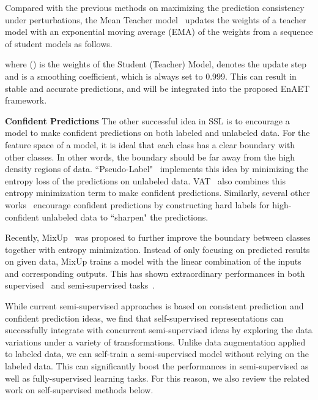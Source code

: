 \documentclass[journal]{IEEEtran}
\begin{document}
\par Compared with the previous methods on maximizing the prediction consistency under perturbations, the Mean Teacher model~\cite{tarvainen2017mean} updates the weights of a teacher model with an exponential moving average (EMA) of the weights from a sequence of student models as follows.

where  () is the weights of the Student (Teacher) Model,  denotes the update step and  is a smoothing coefficient, which is always set to 0.999. This can result in stable and accurate predictions, and will be integrated into the proposed EnAET framework.


{\noindent\bf Confident Predictions} The other successful idea in SSL is to encourage a model to make confident predictions on both labeled and unlabeled data. For the feature space of a model, it is ideal that each class has a clear boundary with other classes. In other words, the boundary  should be far away from the high density regions of data. ``Pseudo-Label"~\cite{grandvalet2005semi}  implements this idea by minimizing the entropy loss of the predictions on unlabeled data. VAT~\cite{miyato2018virtual} also combines this entropy minimization term to make confident predictions. Similarly, several other works~\cite{lee2013pseudo,berthelot2019mixmatch} encourage confident predictions by constructing hard labels for high-confident unlabeled data to ``sharpen" the predictions.

\par Recently, MixUp~\cite{zhang2017mixup} was proposed to further improve the boundary between classes together with entropy minimization. Instead of only focusing on predicted results on given data, MixUp trains a model with the linear combination of the inputs and corresponding outputs. This has shown extraordinary performances in both supervised~\cite{zhang2017mixup} and semi-supervised tasks~\cite{berthelot2019mixmatch,verma2019interpolation}.

While current semi-supervised approaches is based on consistent prediction and confident prediction ideas, we find that self-supervised representations can successfully integrate with concurrent semi-supervised ideas by exploring the data variations under a variety of transformations. Unlike data augmentation applied to labeled data, we can self-train a semi-supervised model without relying on the labeled data. This can significantly boost the performances in semi-supervised as well as fully-supervised learning tasks. For this reason, we also review the related work on self-supervised methods below.
\end{document}
